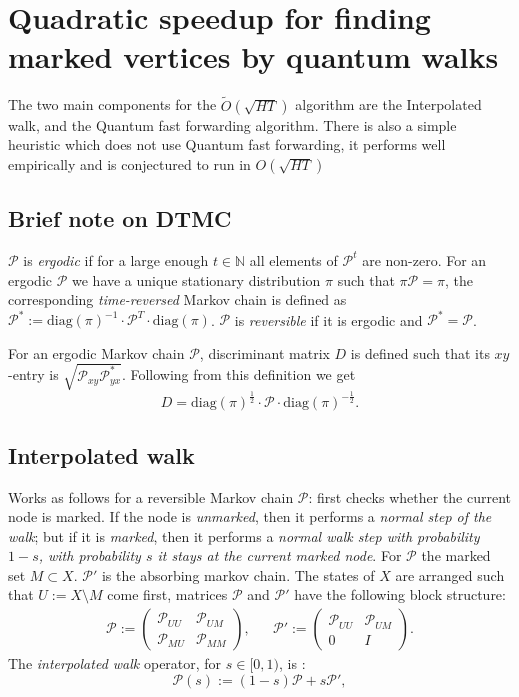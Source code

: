 \documentclass{article}
\newcommand{\diag}[1]{\mathrm{diag}\left( #1 \right)}
\newcommand{\N}{\mathbb{N}}
\newcommand{\PM}{\mathcal{P}}
\begin{document}
\section{Quadratic speedup for finding marked vertices by quantum walks}

The two main components for the $\tilde{O}(\sqrt{HT})$  algorithm are the Interpolated walk, and the Quantum fast forwarding algorithm. There is also a simple heuristic which does not use Quantum fast forwarding, it performs well empirically and is conjectured to run in $O(\sqrt{HT})$ 

\subsection{Brief note on DTMC}

$\PM$ is \emph{ergodic} if for a large enough $t\in \N$ all elements of $\PM^t$ are non-zero. For an ergodic $\PM$ we have a unique stationary distribution $\pi$ such that $\pi\PM = \pi$, the corresponding \emph{time-reversed} Markov chain is defined as $\PM^*:=\diag{\pi}^{-1}\cdot\PM^T\cdot\diag{\pi}$.  $\PM$ is \emph{reversible} if it is ergodic and $\PM^*=\PM$.

For an ergodic Markov chain $\PM$, discriminant matrix $D$ is defined such that its $xy$-entry is $\sqrt{\PM_{xy}\PM^*_{yx}}$. Following from this definition we get
\begin{equation}\label{eq:discriminant}
D=\diag{\pi}^{\frac12}\cdot\PM\cdot\diag{\pi}^{-\frac12}.
\end{equation}

\subsection{Interpolated walk}

Works as follows for a reversible Markov chain $\PM$: first checks whether the current node is marked. If the node is \emph{unmarked}, then it performs a \emph{normal step of the walk}; but if it is \emph{marked}, then it performs a \emph{normal walk step with probability $1-s$, with probability $s$ it stays at the current marked node}. For $\PM$ the marked set $M\subset X$. 
$\PM'$ is the absorbing markov chain.
The states of $X$ are arranged such that $U := X \setminus M$ come first, matrices $\PM$ and $\PM'$ have the following block structure:
\begin{align*}
\PM :=\left(\begin{array}{cc} \PM_{UU} & \PM_{UM} \\ \PM_{MU} & \PM_{MM} \end{array}\right), & &
\PM' :=\left(\begin{array}{cc} \PM_{UU} & \PM_{UM} \\ 0 & I \end{array}\right).
\end{align*}
The \emph{interpolated walk} operator, for $s\in [0,1)$, is :
\begin{equation}\label{eq:interpolChainDef}
\PM(s):=(1 - s)\PM + s\PM',
\end{equation}
\end{document}
